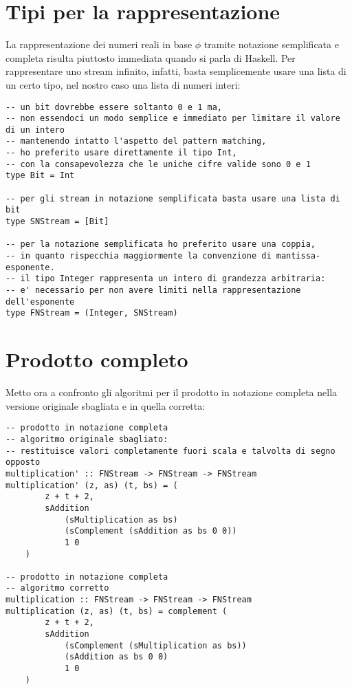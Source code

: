 \documentclass[Lau]{sapthesis}
\begin{document}
\section{Tipi per la rappresentazione}
La rappresentazione dei numeri reali in base $\phi$ tramite notazione semplificata e completa risulta piuttosto immediata quando si parla di Haskell. Per rappresentare uno stream infinito, infatti, basta semplicemente usare una lista di un certo tipo, nel nostro caso una lista di numeri interi:
\begin{verbatim}
-- un bit dovrebbe essere soltanto 0 e 1 ma,
-- non essendoci un modo semplice e immediato per limitare il valore di un intero
-- mantenendo intatto l'aspetto del pattern matching,
-- ho preferito usare direttamente il tipo Int,
-- con la consapevolezza che le uniche cifre valide sono 0 e 1
type Bit = Int

-- per gli stream in notazione semplificata basta usare una lista di bit
type SNStream = [Bit]

-- per la notazione semplificata ho preferito usare una coppia,
-- in quanto rispecchia maggiormente la convenzione di mantissa-esponente.
-- il tipo Integer rappresenta un intero di grandezza arbitraria:
-- e' necessario per non avere limiti nella rappresentazione dell'esponente
type FNStream = (Integer, SNStream)
\end{verbatim}


\section{Prodotto completo}
Metto ora a confronto gli algoritmi per il prodotto in notazione completa nella versione originale sbagliata e in quella corretta:
\begin{verbatim}
-- prodotto in notazione completa
-- algoritmo originale sbagliato:
-- restituisce valori completamente fuori scala e talvolta di segno opposto
multiplication' :: FNStream -> FNStream -> FNStream
multiplication' (z, as) (t, bs) = (
        z + t + 2,
        sAddition
            (sMultiplication as bs)
            (sComplement (sAddition as bs 0 0))
            1 0
    )

-- prodotto in notazione completa
-- algoritmo corretto
multiplication :: FNStream -> FNStream -> FNStream
multiplication (z, as) (t, bs) = complement (
        z + t + 2,
        sAddition
            (sComplement (sMultiplication as bs))
            (sAddition as bs 0 0)
            1 0
    )
\end{verbatim}
\end{document}
